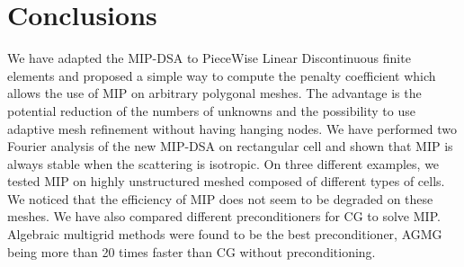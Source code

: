 \section{Conclusions} \label{sec_conc}
We have adapted the MIP-DSA to PieceWise Linear Discontinuous finite elements
and proposed a simple way to compute the penalty coefficient which allows the 
use of MIP on arbitrary polygonal meshes. The advantage is the potential 
reduction of the numbers of unknowns and the possibility to use adaptive mesh 
refinement without having hanging nodes. We have performed two Fourier analysis 
of the new MIP-DSA on rectangular cell and shown that MIP is always stable when 
the scattering is isotropic. On three different examples, we tested MIP on highly
unstructured meshed composed of different types of cells. We noticed that the
efficiency of MIP does not seem to be degraded on these meshes. We have also
compared different preconditioners for CG to solve MIP. Algebraic multigrid
methods were found to be the best preconditioner, AGMG being more than 20 times
faster than CG without preconditioning.
